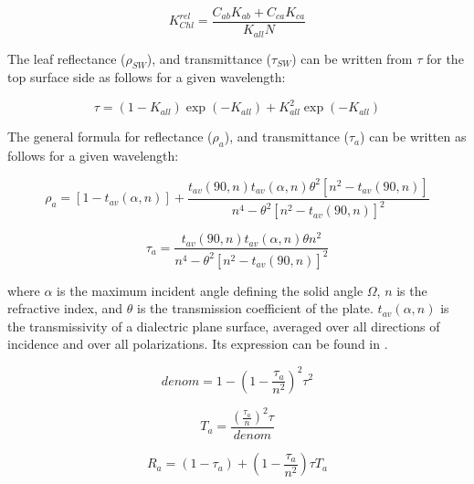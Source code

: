 \documentclass[twoside,10pt]{report}
\begin{document}
\begin{equation}
 K_{Chl}^{rel} =  \frac{C_{ab}K_{ab}+C_{ca}K_{ca}}{K_{all}N}
\label{leaf_optical_properties:KChlrel}
\end{equation}

The leaf reflectance ($\rho_{SW}$), and transmittance ($\tau_{SW}$) can be written from $\tau$ for the top surface side as follows for a given wavelength:

\begin{equation}
 \tau =  (1 - K_{all})\exp{(-K_{all})} + K_{all}^2 \exp{(-K_{all})}
\label{leaf_optical_properties:tau}
\end{equation}
 
 The general formula for reflectance ($\rho_{a}$), and transmittance ($\tau_{a}$) can be written as follows for a given wavelength:
 
 \begin{equation}
 \rho_{a} =  \left[ 1 - t_{av}(\alpha,n) \right] + \frac{t_{av}(90,n) t_{av}(\alpha,n) \theta^2 \left[ n^2 - t_{av}(90,n) \right] }{n^4 - \theta^2 \left[ n^2 - t_{av}(90,n) \right]^2}
\label{leaf_optical_properties:top_reflectance}
\end{equation}

 \begin{equation}
 \tau_{a} =  \frac{t_{av}(90,n) t_{av}(\alpha,n) \theta n^2 }{n^4 - \theta^2 \left[ n^2 - t_{av}(90,n) \right]^2}
\label{leaf_optical_properties:top_transmittance}
\end{equation}
 
\noindent where $\alpha$ is the maximum incident angle defining the solid angle $\Omega$, $n$ is the refractive index, and $\theta$ is the transmission coefficient of the plate. $t_{av}(\alpha,n)$ is the transmissivity of a dialectric plane surface, averaged over all directions of incidence and over all polarizations. Its expression can be found in  \citet{Stern1964,Allen1973}.

\begin{equation}
 denom =  1 - (1 - \frac{\tau_a}{n^2})^2 \tau^2
\label{leaf_optical_properties:denom}
\end{equation}

\begin{equation}
 T_a =  \frac{(\frac{\tau_a}{n})^2 \tau}{denom}
\label{leaf_optical_properties:Ta}
\end{equation}

\begin{equation}
 R_a =  (1 - \tau_a) + (1 - \frac{\tau_a}{n^2}) \tau T_a
\label{leaf_optical_properties:Ra}
\end{equation}
\end{document}
